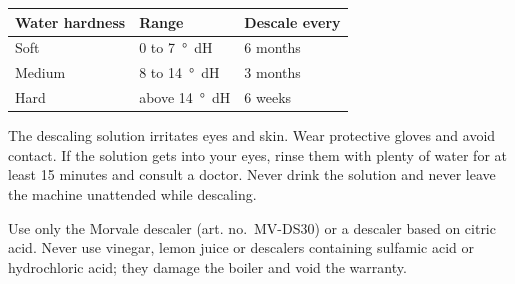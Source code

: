 \documentclass[10pt,a4paper]{article}
\begin{document}
\begin{center}
\begin{tabular}{@{}l l l@{}}
  \toprule
  \textbf{Water hardness} & \textbf{Range} & \textbf{Descale every} \\
  \midrule
  Soft & 0 to \qty{7}{\degree dH} & 6 months \\
  Medium & 8 to \qty{14}{\degree dH} & 3 months \\
  Hard & above \qty{14}{\degree dH} & 6 weeks \\
  \bottomrule
\end{tabular}
\end{center}

\begin{warnbox}
The descaling solution irritates eyes and skin. Wear protective gloves and avoid contact. If the solution
gets into your eyes, rinse them with plenty of water for at least 15 minutes and consult a doctor. Never
drink the solution and never leave the machine unattended while descaling.
\end{warnbox}

\begin{cautionbox}
Use only the Morvale descaler (art. no.\ MV-DS30) or a descaler based on citric acid. Never use vinegar,
lemon juice or descalers containing sulfamic acid or hydrochloric acid; they damage the boiler and void the
warranty.
\end{cautionbox}
\end{document}
